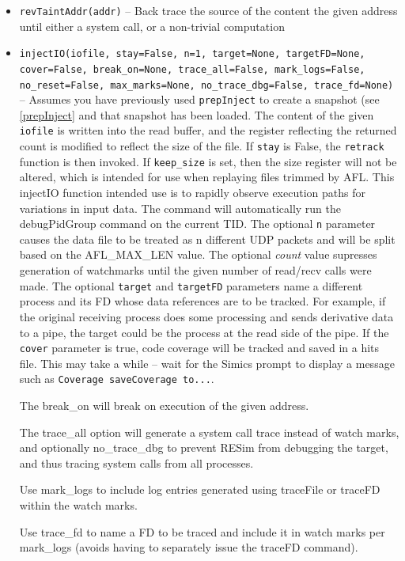 \documentclass[titlepage]{article}
\begin{document}
\begin{itemize}
\item {\tt revTaintAddr(addr)} -- Back trace the source of the content the given address until either a system call, or a non-trivial computation

\item {\tt injectIO(iofile, stay=False, n=1, target=None, targetFD=None, cover=False, break\_on=None, trace\_all=False, mark\_logs=False, no\_reset=False, max\_marks=None, no\_trace\_dbg=False, trace\_fd=None)} -- Assumes you have previously used {\tt prepInject}
to create a snapshot (see \ref{prepInject} and that snapshot has been loaded.
The content of the given {\tt iofile} is written into the read buffer, and the register reflecting 
the returned count is modified to reflect the size of the file.  If {\tt stay} is False, the {\tt retrack} function is then invoked. If {\tt keep\_size} is
set, then the size register will not be altered, which is intended for use when replaying files trimmed by AFL.
This injectIO function intended use is to rapidly observe execution paths for variations in input data. The command will automatically
run the debugPidGroup command on the current TID. The optional {\tt n} parameter causes the data file to be treated as n different UDP packets and will be split
based on the AFL\_MAX\_LEN value.  The optional \textit{count} value supresses generation of watchmarks until the given number of read/recv calls were made.
The optional {\tt target} and {\tt targetFD} parameters name a different process and its FD whose data references are to be tracked.  For example,
if the original receiving process does some processing and sends derivative data to a pipe, the target could be the process at the read side
of the pipe.  If the {\tt cover} parameter is true, code coverage will be tracked and saved in a hits file.  This may take a while -- wait for the
Simics prompt to display a message such as {\tt Coverage saveCoverage to...}.

The break\_on will break on execution of the given address. 

The trace\_all option will generate a system call trace instead of watch marks, and optionally no\_trace\_dbg to prevent
RESim from debugging the target, and thus tracing system calls from all processes. 

Use mark\_logs to include log entries generated using traceFile or traceFD within the watch marks.

Use trace\_fd to name a FD to be traced and include it in watch marks per mark\_logs (avoids having to separately issue the traceFD command).


\end{itemize}
\end{document}
